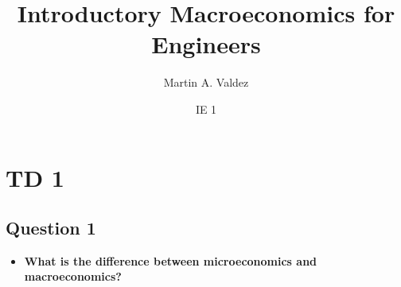 \documentclass[11pt]{article}
\title{Introductory Macroeconomics for Engineers}
\author{Martin A. Valdez}
\date{IE 1}
\begin{document}
\maketitle

\section{TD 1}
\subsection{Question 1}

\begin{itemize}
\item \textbf{What is the difference between microeconomics and macroeconomics?}
\end{itemize}
\end{document}
